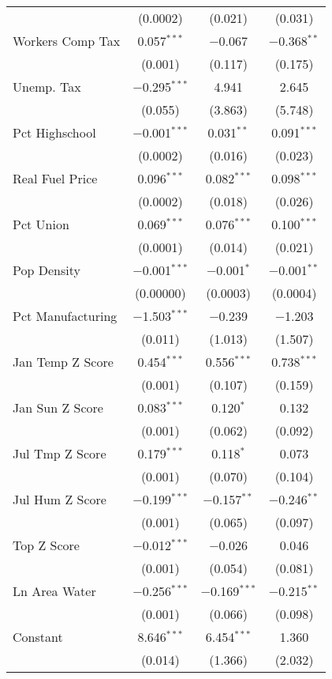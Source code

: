 \begin{table}[!htbp]
\begin{tabular}{@{\extracolsep{5pt}}lccc}
  & (0.0002) & (0.021) & (0.031) \\ 
  Workers Comp Tax & 0.057$^{***}$ & $-$0.067 & $-$0.368$^{**}$ \\ 
  & (0.001) & (0.117) & (0.175) \\ 
  Unemp. Tax & $-$0.295$^{***}$ & 4.941 & 2.645 \\ 
  & (0.055) & (3.863) & (5.748) \\ 
  Pct Highschool & $-$0.001$^{***}$ & 0.031$^{**}$ & 0.091$^{***}$ \\ 
  & (0.0002) & (0.016) & (0.023) \\ 
  Real Fuel Price & 0.096$^{***}$ & 0.082$^{***}$ & 0.098$^{***}$ \\ 
  & (0.0002) & (0.018) & (0.026) \\ 
  Pct Union & 0.069$^{***}$ & 0.076$^{***}$ & 0.100$^{***}$ \\ 
  & (0.0001) & (0.014) & (0.021) \\ 
  Pop Density & $-$0.001$^{***}$ & $-$0.001$^{*}$ & $-$0.001$^{**}$ \\ 
  & (0.00000) & (0.0003) & (0.0004) \\ 
  Pct Manufacturing & $-$1.503$^{***}$ & $-$0.239 & $-$1.203 \\ 
  & (0.011) & (1.013) & (1.507) \\ 
  Jan Temp Z Score & 0.454$^{***}$ & 0.556$^{***}$ & 0.738$^{***}$ \\ 
  & (0.001) & (0.107) & (0.159) \\ 
  Jan Sun Z Score & 0.083$^{***}$ & 0.120$^{*}$ & 0.132 \\ 
  & (0.001) & (0.062) & (0.092) \\ 
  Jul Tmp Z Score & 0.179$^{***}$ & 0.118$^{*}$ & 0.073 \\ 
  & (0.001) & (0.070) & (0.104) \\ 
  Jul Hum Z Score & $-$0.199$^{***}$ & $-$0.157$^{**}$ & $-$0.246$^{**}$ \\ 
  & (0.001) & (0.065) & (0.097) \\ 
  Top Z Score & $-$0.012$^{***}$ & $-$0.026 & 0.046 \\ 
  & (0.001) & (0.054) & (0.081) \\ 
  Ln Area Water & $-$0.256$^{***}$ & $-$0.169$^{***}$ & $-$0.215$^{**}$ \\ 
  & (0.001) & (0.066) & (0.098) \\ 
  Constant & 8.646$^{***}$ & 6.454$^{***}$ & 1.360 \\ 
  & (0.014) & (1.366) & (2.032) \\ 

\end{tabular}
\end{table}
